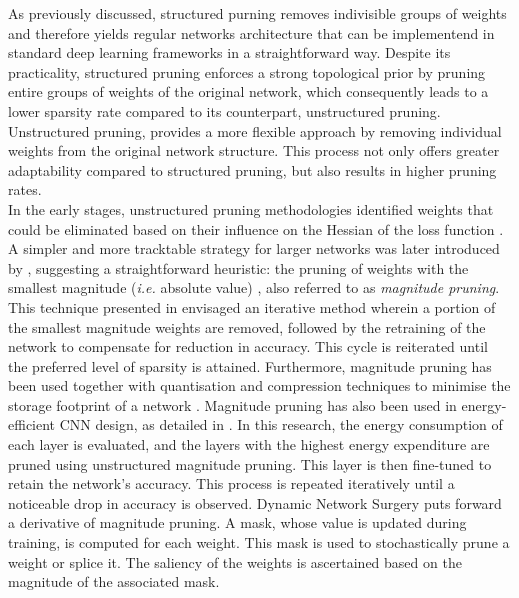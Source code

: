As previously discussed, structured purning removes indivisible groups of
weights and therefore yields regular networks architecture that can be
implementend in standard deep learning frameworks in a straightforward way.
Despite its practicality, structured pruning enforces a strong topological prior
by pruning entire groups of weights of the original network, which consequently
leads to a lower sparsity rate compared to its counterpart, unstructured
pruning. Unstructured pruning, provides a more flexible approach by removing
individual weights from the original network structure. This process not only
offers greater adaptability compared to structured pruning, but also results in
higher pruning rates.\\

In the early stages, unstructured pruning methodologies identified weights that
could be eliminated based on their influence on the Hessian of the loss function
\cite{DBLP:conf/nips/CunDS89,DBLP:conf/icnn/HassibiSW93,DBLP:conf/nips/HassibiSW93}.
A simpler and more tracktable strategy for larger networks was later introduced
by \citeauthor{DBLP:conf/nips/HanPTD15}, suggesting a straightforward heuristic:
the pruning of weights with the smallest magnitude (\emph{i.e.} absolute value)
\cite{DBLP:conf/nips/HanPTD15}, also referred to as \emph{magnitude pruning}.
This technique presented in \cite{DBLP:conf/nips/HanPTD15} envisaged an
iterative method wherein a portion of the smallest magnitude weights are
removed, followed by the retraining of the network to compensate for reduction
in accuracy. This cycle is reiterated until the preferred level of sparsity is
attained. Furthermore, magnitude pruning has been used together with
quantisation and compression techniques to minimise the storage footprint of a
network \cite{DBLP:journals/corr/HanMD15}. Magnitude pruning has also been used
in energy-efficient \ac{CNN} design, as detailed in
\cite{DBLP:conf/cvpr/YangCS17}. In this research, the energy consumption of each
layer is evaluated, and the layers with the highest energy expenditure are
pruned using unstructured magnitude pruning. This layer is then fine-tuned to
retain the network's accuracy. This process is repeated iteratively until a
noticeable drop in accuracy is observed. Dynamic Network Surgery
\cite{DBLP:conf/nips/GuoYC16} puts forward a derivative of magnitude pruning. A
mask, whose value is updated during training, is computed for each weight. This
mask is used to stochastically prune a weight or splice it. The saliency of the
weights is ascertained based on the magnitude of the associated mask.\\

